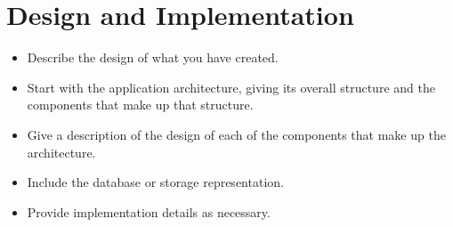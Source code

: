 \section{Design and Implementation}
\label{sec:imp}

\begin{framed}
	\begin{itemize}
		\item Describe the design of what you have created.
		\item Start with the application architecture, giving its overall structure and the components that make up that structure.
		\item Give a description of the design of each of the components that make up the architecture.
		\item Include the database or storage representation.
		\item Provide implementation details as necessary.
	\end{itemize}
\end{framed}
